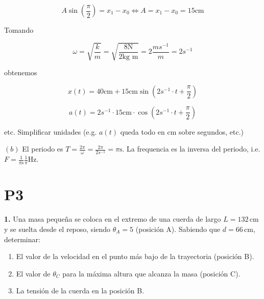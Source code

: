 \documentclass[12pt]{article}
\theoremstyle{definition}
\begin{document}
\begin{equation*}
    A \sin\left( \frac{\pi}{2} \right) = x_1 - x_0 \iff A = x_1 - x_0 =
    15\text{cm}
\end{equation*}

Tomando 

\begin{equation*}
    \omega = \sqrt{\frac{k}{m}}  = \sqrt{\frac{8\text{N}}{2\text{kg m}}} =
    2\frac{ms^{-1}}{m} = 2s^{-1}
\end{equation*}

obtenemos 

\begin{equation*}
    x(t) = 40\text{cm} + 15\text{cm}\sin\left( 2s^{-1} \cdot t + \frac{\pi}{2} \right) 
\end{equation*}


\begin{equation*}
    a(t) = 2s^{-1} \cdot 15\text{cm} \cdot \cos \left( 2s^{-1} \cdot t +
    \frac{\pi}{2} \right) 
\end{equation*}

etc. Simplificar unidades (e.g. $a(t)$ queda todo en cm sobre segundos, etc.)

$(b)$ El periodo es $T = \frac{2\pi}{\omega} = \frac{2\pi}{2s^{-1}} =
\pi\text{s}$. La frequencia es la inversa del periodo, i.e. $F =
\frac{1}{\pi\text{s}} \frac{1}{\pi}\text{Hz}$.

\pagebreak 

\section{P3}


\begin{shaded}
\textbf{1.} Una masa pequeña se coloca en el extremo de una cuerda de largo 
$L = 132 \, \text{cm}$ y se suelta desde el reposo, siendo $\theta_A = 5$ 
(posición A). Sabiendo que $d = 66 \, \text{cm}$, determinar:

\begin{enumerate}[label=(\alph*)]
    \item El valor de la velocidad en el punto más bajo de la trayectoria 
    (posición B).
    \item El valor de $\theta_C$ para la máxima altura que alcanza la masa 
    (posición C).
    \item La tensión de la cuerda en la posición B.
\end{enumerate}


\end{shaded}
\end{document}
